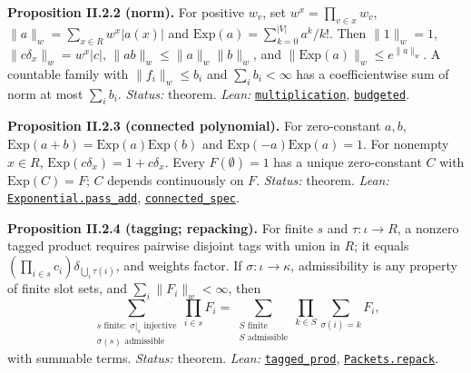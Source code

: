 \documentclass[
  letterpaper,
  11pt]{article}
\newcounter{none} %
\begin{document}
\textbf{Proposition II.2.2 (norm).} For positive \(w_v\), set
\(w^x=\prod_{v\in x}w_v\), \(\|a\|_w=\sum_{x\in R}w^x|a(x)|\) and
\(\mathrm{Exp}(a)=\sum_{k=0}^{|V|}a^k/k!\). Then \(\|1\|_w=1\),
\(\|c\delta_x\|_w=w^x|c|\), \(\|ab\|_w\le\|a\|_w\|b\|_w\), and
\(\|\mathrm{Exp}(a)\|_w\le e^{\|a\|_w}\). A countable family with
\(\|f_i\|_w\le b_i\) and \(\sum_i b_i<\infty\) has a coefficientwise sum
of norm at most \(\sum_i b_i\). \emph{Status:} theorem. \emph{Lean:}
\href{https://github.com/yang-mills-group/OpenAI-YM-20261028/blob/3456e5e75cf8d4cd558955a5c7638fba2d68f464/YM/Marker/Weight.lean\#L139-L146}{\texttt{multiplication}},
\href{https://github.com/yang-mills-group/OpenAI-YM-20261028/blob/3456e5e75cf8d4cd558955a5c7638fba2d68f464/YM/Marker/Truncated.lean\#L51-L58}{\texttt{budgeted}}.

\textbf{Proposition II.2.3 (connected polynomial).} For zero-constant
\(a,b\), \(\mathrm{Exp}(a+b)=\mathrm{Exp}(a)\mathrm{Exp}(b)\) and
\(\mathrm{Exp}(-a)\mathrm{Exp}(a)=1\). For nonempty \(x\in R\),
\(\mathrm{Exp}(c\delta_x)=1+c\delta_x\). Every \(F(\emptyset)=1\) has a
unique zero-constant \(C\) with \(\mathrm{Exp}(C)=F\); \(C\) depends
continuously on \(F\). \emph{Status:} theorem. \emph{Lean:}
\href{https://github.com/yang-mills-group/OpenAI-YM-20261028/blob/3456e5e75cf8d4cd558955a5c7638fba2d68f464/YM/Next/RANK/Exponential.lean\#L56-L88}{\texttt{Exponential.pass\_add}},
\href{https://github.com/yang-mills-group/OpenAI-YM-20261028/blob/3456e5e75cf8d4cd558955a5c7638fba2d68f464/YM/Next/RANK/Exponential.lean\#L179-L180}{\texttt{connected\_spec}}.

\textbf{Proposition II.2.4 (tagging; repacking).} For finite \(s\) and
\(\tau:\iota\to R\), a nonzero tagged product requires pairwise disjoint
tags with union in \(R\); it equals
\((\prod_{i\in s}c_i)\delta_{\bigcup_i\tau(i)}\), and weights factor. If
\(\sigma:\iota\to\kappa\), admissibility is any property of finite slot
sets, and \(\sum_i\|F_i\|_w<\infty\), then
\[\sum_{\substack{s\text{ finite}:\ \sigma|_s\text{ injective}\\\sigma(s)\text{ admissible}}}\prod_{i\in s}F_i=\sum_{\substack{S\text{ finite}\\S\text{ admissible}}}\prod_{k\in S}\sum_{\sigma(i)=k}F_i,\]
with summable terms. \emph{Status:} theorem. \emph{Lean:}
\href{https://github.com/yang-mills-group/OpenAI-YM-20261028/blob/3456e5e75cf8d4cd558955a5c7638fba2d68f464/YM/Extra/MULTISOURCE_TRAJECTORIES/Algebra.lean\#L57-L69}{\texttt{tagged\_prod}},
\href{https://github.com/yang-mills-group/OpenAI-YM-20261028/blob/3456e5e75cf8d4cd558955a5c7638fba2d68f464/YM/Extra/MULTISOURCE_TRAJECTORIES/Packets.lean\#L114-L124}{\texttt{Packets.repack}}.
\end{document}
